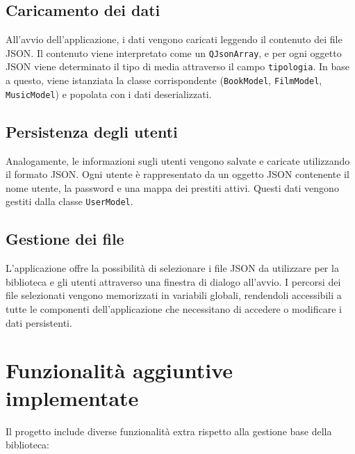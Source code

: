\documentclass[a4paper,10pt]{article}
\begin{document}
\subsection{Caricamento dei dati}

All'avvio dell'applicazione, i dati vengono caricati leggendo il contenuto dei file JSON. Il contenuto viene interpretato come un \texttt{QJsonArray}, e per ogni oggetto JSON viene determinato il tipo di media attraverso il campo \texttt{tipologia}. In base a questo, viene istanziata la classe corrispondente (\texttt{BookModel}, \texttt{FilmModel}, \texttt{MusicModel}) e popolata con i dati deserializzati.

\subsection{Persistenza degli utenti}

Analogamente, le informazioni sugli utenti vengono salvate e caricate utilizzando il formato JSON. Ogni utente è rappresentato da un oggetto JSON contenente il nome utente, la password e una mappa dei prestiti attivi. Questi dati vengono gestiti dalla classe \texttt{UserModel}.

\subsection{Gestione dei file}

L'applicazione offre la possibilità di selezionare i file JSON da utilizzare per la biblioteca e gli utenti attraverso una finestra di dialogo all'avvio. I percorsi dei file selezionati vengono memorizzati in variabili globali, rendendoli accessibili a tutte le componenti dell'applicazione che necessitano di accedere o modificare i dati persistenti.

\section{Funzionalità aggiuntive implementate}

Il progetto include diverse funzionalità extra rispetto alla gestione base della biblioteca:
\end{document}
